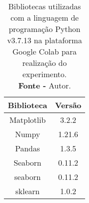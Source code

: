 \begin{table}[H]
\centering
\begin{tabular}{@{}cc@{}}
\toprule
\textbf{Biblioteca} & \textbf{Versão} \\ \midrule
Matplotlib          & 3.2.2           \\
Numpy               & 1.21.6          \\
Pandas              & 1.3.5           \\
Seaborn             & 0.11.2          \\
seaborn	            & 0.11.2          \\
sklearn	            & 1.0.2           \\
\bottomrule
\end{tabular}
\caption{Bibliotecas utilizadas com a linguagem de programação Python v3.7.13 na plataforma Google Colab para realização do experimento. \\ \textbf{Fonte -} Autor.}
\label{tab: bibliotecas-python}
\end{table}